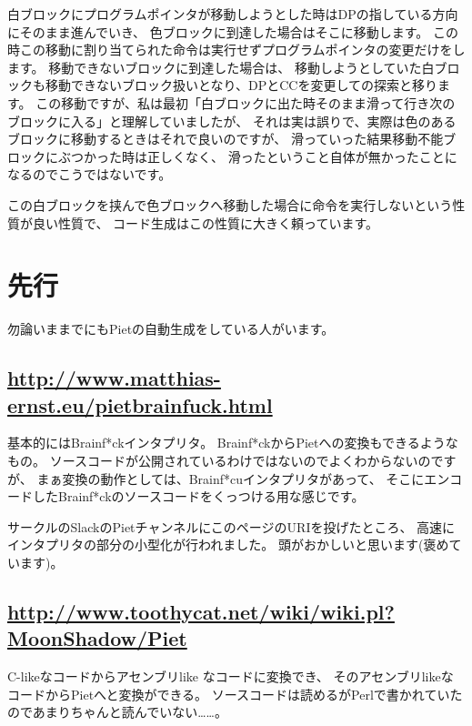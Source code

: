 白ブロックにプログラムポインタが移動しようとした時はDPの指している方向にそのまま進んでいき、
色ブロックに到達した場合はそこに移動します。
この時この移動に割り当てられた命令は実行せずプログラムポインタの変更だけをします。
移動できないブロックに到達した場合は、
移動しようとしていた白ブロックも移動できないブロック扱いとなり、DPとCCを変更しての探索と移ります。
この移動ですが、私は最初「白ブロックに出た時そのまま滑って行き次のブロックに入る」と理解していましたが、
それは実は誤りで、実際は色のあるブロックに移動するときはそれで良いのですが、
滑っていった結果移動不能ブロックにぶつかった時は正しくなく、
滑ったということ自体が無かったことになるのでこうではないです。

この白ブロックを挟んで色ブロックへ移動した場合に命令を実行しないという性質が良い性質で、
コード生成はこの性質に大きく頼っています。

\section{先行}

勿論いままでにもPietの自動生成をしている人がいます。

\subsection{\texorpdfstring{\url{http://www.matthias-ernst.eu/pietbrainfuck.html}}{http://www.matthias-ernst.eu/pietbrainfuck.html}}

基本的にはBrainf*ckインタプリタ。
Brainf*ckからPietへの変換もできるようなもの。
ソースコードが公開されているわけではないのでよくわからないのですが、
まぁ変換の動作としては、Brainf*cuインタプリタがあって、
そこにエンコードしたBrainf*ckのソースコードをくっつける用な感じです。

サークルのSlackのPietチャンネルにこのページのURIを投げたところ、
高速にインタプリタの部分の小型化が行われました。
頭がおかしいと思います(褒めています)。

\subsection{\texorpdfstring{\url{http://www.toothycat.net/wiki/wiki.pl?MoonShadow/Piet}}{http://www.toothycat.net/wiki/wiki.pl?MoonShadow/Piet}}

C-likeなコードからアセンブリlike なコードに変換でき、 そのアセンブリlikeなコードからPietへと変換ができる。
ソースコードは読めるがPerlで書かれていたのであまりちゃんと読んでいない\dots\dots。

